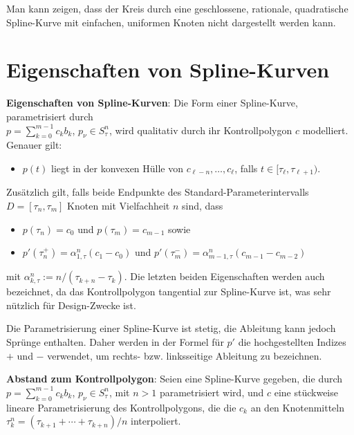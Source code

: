 Man kann zeigen, dass der Kreis durch eine geschlossene, rationale, quadratische
Spline-Kurve mit einfachen, uniformen Knoten nicht dargestellt werden kann.

\section{%
    Eigenschaften von Spline-Kurven%
}

\textbf{Eigenschaften von Spline-Kurven}:
Die Form einer Spline-Kurve, parametrisiert durch\\
$p = \sum_{k=0}^{m-1} c_k b_k$, $p_\nu \in S_\tau^n$,
wird qualitativ durch ihr Kontrollpolygon $c$ modelliert.
Genauer gilt:
\begin{itemize}
    \item
    $p(t)$ liegt in der konvexen Hülle von $c_{\ell-n}, \dotsc, c_\ell$, falls
    $t \in [\tau_\ell, \tau_{\ell+1})$.
\end{itemize}
Zusätzlich gilt, falls beide Endpunkte des Standard-Parameterintervalls $D = [\tau_n, \tau_m]$
Knoten mit Vielfachheit $n$ sind, dass
\begin{itemize}
    \item
    $p(\tau_n) = c_0$ und $p(\tau_m) = c_{m-1}$ sowie

    \item
    $p'(\tau_n^+) = \alpha_{1,\tau}^n (c_1 - c_0)$ und
    $p'(\tau_m^-) = \alpha_{m-1,\tau}^n (c_{m-1} - c_{m-2})$
\end{itemize}
mit $\alpha_{k,\tau}^n := n/(\tau_{k+n} - \tau_k)$.
Die letzten beiden Eigenschaften werden auch  bezeichnet,
da das Kontrollpolygon tangential zur Spline-Kurve ist, was sehr nützlich für Design-Zwecke ist.

Die Parametrisierung einer Spline-Kurve ist stetig, die Ableitung kann jedoch Sprünge enthalten.
Daher werden in der Formel für $p'$ die hochgestellten Indizes $+$ und $-$ verwendet,
um rechts- bzw. linksseitige Ableitung zu bezeichnen.

\linie
\pagebreak

\textbf{Abstand zum Kontrollpolygon}:
Seien eine Spline-Kurve gegeben, die durch $p = \sum_{k=0}^{m-1} c_k b_k$, $p_\nu \in S_\tau^n$,
mit $n > 1$ parametrisiert wird,
und $c$ eine stückweise lineare Parametrisierung des Kontrollpolygons,
die die $c_k$ an den Knotenmitteln $\tau_k^n = (\tau_{k+1} + \dotsb + \tau_{k+n})/n$
interpoliert.

